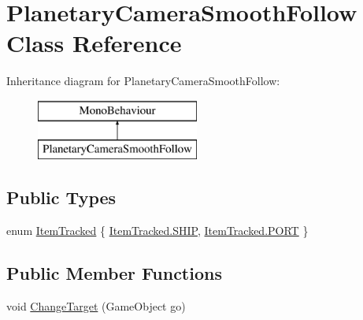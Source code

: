 \hypertarget{class_planetary_camera_smooth_follow}{}\section{Planetary\+Camera\+Smooth\+Follow Class Reference}
\label{class_planetary_camera_smooth_follow}
Inheritance diagram for Planetary\+Camera\+Smooth\+Follow\+:\begin{figure}[H]
\begin{center}
\leavevmode
\includegraphics[height=2.000000cm]{class_planetary_camera_smooth_follow}
\end{center}
\end{figure}
\subsection*{Public Types}
\begin{DoxyCompactItemize}
\item 
enum \hyperlink{class_planetary_camera_smooth_follow_afa0d6f2c2eeb983407f6c0594abd2e20}{Item\+Tracked} \{ \hyperlink{class_planetary_camera_smooth_follow_afa0d6f2c2eeb983407f6c0594abd2e20a43faba084d0165852e5556db67a55378}{Item\+Tracked.\+S\+H\+IP}, 
\hyperlink{class_planetary_camera_smooth_follow_afa0d6f2c2eeb983407f6c0594abd2e20a463c00141b4c3a7f76acd3540052f8f5}{Item\+Tracked.\+P\+O\+RT}
 \}
\end{DoxyCompactItemize}
\subsection*{Public Member Functions}
\begin{DoxyCompactItemize}
\item 
void \hyperlink{class_planetary_camera_smooth_follow_a0b9a773787fdf41098c28b21ec794fe9}{Change\+Target} (Game\+Object go)
\end{DoxyCompactItemize}
